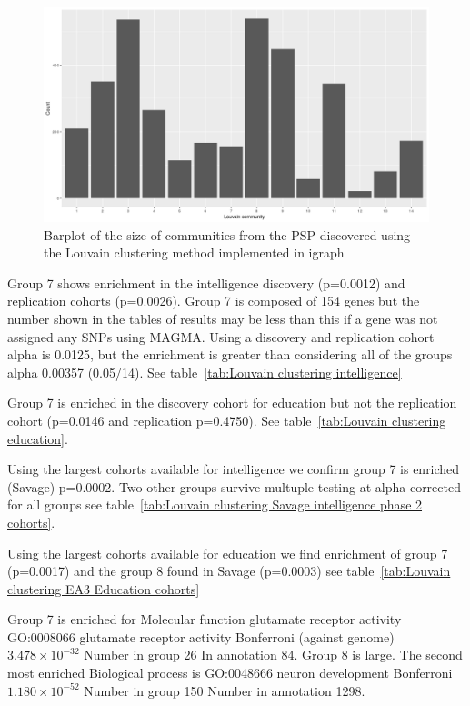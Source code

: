 \begin{figure}
    \centering
    \includegraphics[width=\textwidth]{images/Rplot_Louvain_community_sizes.png}
    \caption{Barplot of the size of communities from the PSP discovered using the Louvain clustering method implemented in igraph}
    \label{fig:barplot_size_commmunities_using_louvain}
\end{figure}

Group 7 shows enrichment in the intelligence discovery (p=0.0012) and replication cohorts (p=0.0026). Group 7 is composed of 154 genes but the number shown in the tables of results may be less than this if a gene was not assigned any SNPs using MAGMA. Using a discovery and replication cohort alpha is 0.0125, but the enrichment is greater than considering all of the groups alpha 0.00357 (0.05/14). See table~\ref{tab:Louvain clustering intelligence}

Group 7 is enriched in the discovery cohort for education but not the replication cohort (p=0.0146 and replication p=0.4750). See table~\ref{tab:Louvain clustering education}.

Using the largest cohorts available for intelligence we confirm group 7 is enriched (Savage) p=0.0002. Two other groups survive multuple testing at alpha corrected for all groups see table~\ref{tab:Louvain clustering Savage intelligence phase 2 cohorts}. 

Using the largest cohorts available for education we find enrichment of group 7 (p=0.0017) and the group 8 found in Savage (p=0.0003) see table~\ref{tab:Louvain clustering EA3 Education cohorts}

Group 7 is enriched for Molecular function glutamate receptor activity GO:0008066 	glutamate receptor activity 		 	Bonferroni (against genome) $3.478 \times 10^{-32}$ 	Number in group 26  In annotation	84. 
Group 8 is large. The second most enriched Biological process is GO:0048666 	neuron development 		Bonferroni	$1.180 \times 10^{-52}$ 	Number in group 150 	Number in annotation 1298.

